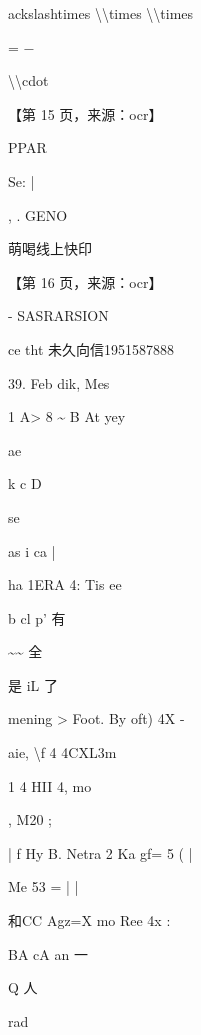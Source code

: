 \documentclass[UTF8,12pt,a4paper,openany]{ctexbook}
\begin{document}
\begin{enumerate}[label=\textbf{\arabic*.},leftmargin=2em]
ackslash{}times \textbackslash{}\textbackslash{}times \textbackslash{}\textbackslash{}times\par = −\par \textbackslash{}\textbackslash{}cdot\par \par 【第 15 页，来源：ocr】\par PPAR\par Se:    |\par ,                                   .                                                         GENO\par 萌喝线上快印\par \par 【第 16 页，来源：ocr】\par -    SASRARSION\par ce tht            未久向信1951587888\par 39. Feb dik, Mes\par 1 A> 8 \textasciitilde{}     B        At   yey\par ae\par k    c      D\par se\par as i ca         |\par ha 1ERA    4: Tis ee\par b        cl       p’         有\par \textasciitilde{}\textasciitilde{}                 全\par 是            iL       了\par mening >           Foot. By oft) 4X                   -\par aie, \textbackslash{}f 4         4CXL3m\par 1          4        HII 4, mo\par ,                             M20            ;\par |                    f         Hy B.     Netra 2 Ka gf= 5               (       |\par Me 53      = |        |\par 和CC Agz=X                           mo Ree 4x        :\par BA  cA  an        一\par Q 人\par rad                 
\end{enumerate}
\end{document}
